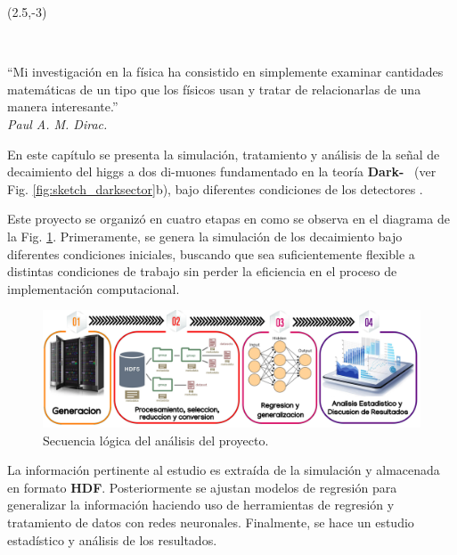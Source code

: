 \begin{textblock}{9}(2.5,-3)
\begin{flushright}
\setlength{\baselineskip}{15pt}
~

``Mi investigación en la física ha consistido en simplemente examinar cantidades matemáticas de un tipo que los físicos usan y tratar de relacionarlas de una manera interesante.''\\[.5cm]
\textit{Paul A. M. Dirac.}
\end{flushright}
\end{textblock}

En este capítulo se presenta la simulación, tratamiento y análisis de la señal de decaimiento del higgs a dos di-muones fundamentado en la teoría \textbf{Dark-}\SUSY~ (ver Fig. \ref{fig:sketch_darksector}b), bajo diferentes condiciones de los detectores \CMS. 


Este proyecto se organizó en cuatro etapas en como se observa en el diagrama de la Fig. \ref{procesos_darksusy}. Primeramente, se genera la simulación de los decaimiento bajo diferentes condiciones iniciales, buscando que sea suficientemente flexible a distintas condiciones de trabajo sin perder la eficiencia en el proceso de implementación computacional.
\begin{figure}[!b]
\centering
\includegraphics[width=1\textwidth]{Simulacion/imagenes/procesos_darksusy.png}
\caption{Secuencia lógica del análisis del proyecto.}
\label{procesos_darksusy}
\end{figure}
La información pertinente al estudio es extraída de la simulación y almacenada en formato \textbf{HDF}. Posteriormente se ajustan modelos de regresión para generalizar la información haciendo uso de herramientas de regresión y tratamiento de datos con redes neuronales. Finalmente, se hace un estudio estadístico y análisis de los resultados.



